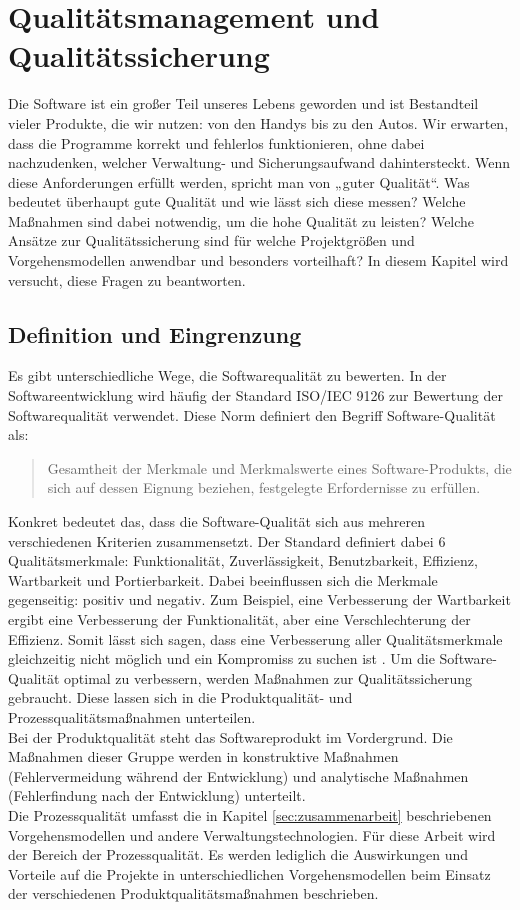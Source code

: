 \section{Qualitätsmanagement und Qualitätssicherung}
\label{sec:qualitaetsmanagement}
Die Software ist ein großer Teil unseres Lebens geworden und ist Bestandteil vieler Produkte, die wir nutzen: von den Handys bis zu den Autos. 
Wir erwarten, dass die Programme korrekt und fehlerlos funktionieren, ohne dabei nachzudenken, welcher Verwaltung- und Sicherungsaufwand dahintersteckt. 
Wenn diese Anforderungen erfüllt werden, spricht man von „guter Qualität“. \cite[1,2]{Schn:2012:Abenteuer:} Was bedeutet überhaupt \glqq gute Qualität\grqq{} und wie lässt sich diese messen?
Welche Maßnahmen sind dabei notwendig, um die hohe Qualität zu leisten? Welche Ansätze zur Qualitätssicherung sind für welche Projektgrößen und Vorgehensmodellen anwendbar und besonders vorteilhaft? 
In diesem Kapitel wird versucht, diese Fragen zu beantworten.

\subsection{Definition und Eingrenzung}
\label{subsec:qualitaetsmanagement:eingrenzung}
Es gibt unterschiedliche Wege, die Softwarequalität zu bewerten. In der Softwareentwicklung wird häufig der Standard ISO/IEC 9126 zur Bewertung der Softwarequalität verwendet. 
Diese Norm definiert den Begriff Software-Qualität als: 
\begin{quote}
    \glqq Gesamtheit der Merkmale und Merkmalswerte eines Software-Produkts, die sich auf dessen Eignung beziehen, festgelegte Erfordernisse zu erfüllen.\grqq{} \cite[6]{Hoff:2008:Software:}
\end{quote}
Konkret bedeutet das, dass die Software-Qualität sich aus mehreren verschiedenen Kriterien zusammensetzt. 
Der Standard definiert dabei 6 Qualitätsmerkmale: Funktionalität, Zuverlässigkeit, Benutzbarkeit, Effizienz, Wartbarkeit und Portierbarkeit. 
Dabei beeinflussen sich die Merkmale gegenseitig: positiv und negativ. Zum Beispiel, eine Verbesserung der Wartbarkeit ergibt eine Verbesserung der Funktionalität, aber eine Verschlechterung der Effizienz. 
Somit lässt sich sagen, dass eine Verbesserung aller Qualitätsmerkmale gleichzeitig nicht möglich und ein Kompromiss zu suchen ist \cite[11]{Hoff:2008:Software:}\cite[132]{Goll:2011:Methoden:}. 
Um die Software-Qualität optimal zu verbessern, werden Maßnahmen zur Qualitätssicherung gebraucht. Diese lassen sich in die Produktqualität- und Prozessqualitätsmaßnahmen unterteilen. 
\\Bei der Produktqualität steht das Softwareprodukt im Vordergrund. Die Maßnahmen dieser Gruppe werden in konstruktive Maßnahmen (Fehlervermeidung während der Entwicklung) und analytische Maßnahmen (Fehlerfindung nach der Entwicklung) unterteilt. 
\\Die Prozessqualität umfasst die in Kapitel \ref{sec:zusammenarbeit} beschriebenen Vorgehensmodellen und andere Verwaltungstechnologien. Für diese Arbeit wird der Bereich der Prozessqualität. Es werden lediglich
die Auswirkungen und Vorteile auf die Projekte in unterschiedlichen Vorgehensmodellen beim Einsatz der verschiedenen Produktqualitätsmaßnahmen beschrieben. 

